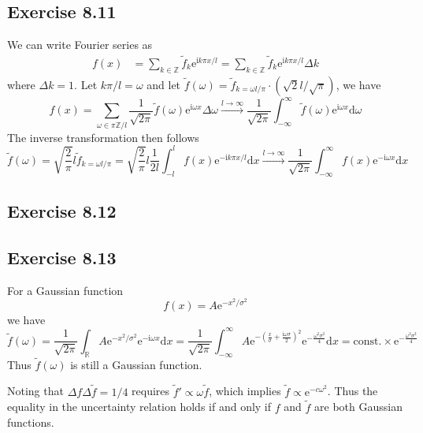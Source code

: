 \documentclass[]{ctexart}
\begin{document}
\subsection{Exercise 8.11} 
We can write Fourier series as
\begin{align*}
f(x)&=\sum_{k\in\mathbb Z}\tilde{f}_k\mathrm{e}^{\mathrm{i}k\pi x/l}=\sum_{k\in\mathbb Z}\tilde{f}_k\mathrm{e}^{\mathrm{i}k\pi x/l}\Delta k
\end{align*}
where $\Delta k=1$. Let $k\pi/l=\omega$ and let $\tilde{f}(\omega)=\tilde{f}_{k=\omega l/\pi}\cdot(\sqrt{2}l/\sqrt{\pi})$, we have 
\begin{equation*}
f(x)=\sum_{\omega\in\pi\mathbb Z/l}\frac{1}{\sqrt{2\pi}}\tilde{f}(\omega)\mathrm{e}^{\mathrm{i}\omega x}\Delta\omega\xrightarrow[]{l\to\infty}\frac{1}{\sqrt{2\pi}}\int_{-\infty}^\infty\tilde{f}(\omega)\mathrm{e}^{\mathrm{i}\omega x}\mathrm{d}\omega
\end{equation*}
The inverse transformation then follows 
\begin{equation*}
\tilde{f}(\omega)=\sqrt{\frac{2}{\pi}}l\tilde{f}_{k=\omega l/\pi}=\sqrt{\frac{2}{\pi}}l\frac{1}{2l}\int_{-l}^l f(x)\mathrm{e}^{-\mathrm{i}k\pi x/l}\mathrm{d}x\xrightarrow[]{l\to\infty}\frac{1}{\sqrt{2\pi}}\int_{-\infty}^{\infty}f(x)\mathrm{e}^{-\mathrm{i}\omega x}\mathrm{d}x
\end{equation*}
\subsection{Exercise 8.12}
\subsection{Exercise 8.13}
For a Gaussian function 
\begin{equation*}
f(x)=A\mathrm{e}^{-x^2/\sigma^2}
\end{equation*}
we have 
\begin{equation*}
\tilde{f}(\omega)=\frac{1}{\sqrt{2\pi}}\int_\mathbb R A\mathrm{e}^{-x^2/\sigma^2}\mathrm{e}^{-\mathrm{i}\omega x}\mathrm{d}x=\frac{1}{\sqrt{2\pi}}\int_{-\infty}^\infty A\mathrm{e}^{-\left(\frac{x}{\sigma}+\frac{\mathrm{i}\omega\sigma}{2}\right)^2}\mathrm{e}^{-\frac{\omega^2\sigma^2}{4}}\mathrm{d}x=\text{const.}\times\mathrm{e}^{-\frac{\omega^2\sigma^2}{4}}
\end{equation*}
Thus $\tilde{f}(\omega)$ is still a Gaussian function. 

Noting that $\Delta f\Delta\tilde{f}=1/4$ requires $\tilde{f}'\propto\omega\tilde{f}$, which implies $\tilde{f}\propto\mathrm{e}^{-c\omega^2}$. 
Thus the equality in the uncertainty relation holds if and only if $f$ and $\tilde{f}$ are both Gaussian functions. 
\end{document}
